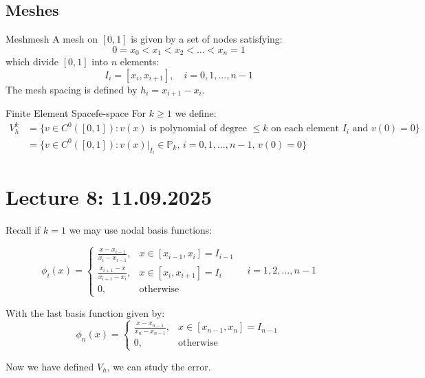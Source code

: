\subsection{Meshes}
\begin{definition}{Mesh}{mesh}
    A mesh on $[0, 1]$ is given by a set of nodes satisfying:
    \[0 = x_0 < x_1 < x_2 < \ldots < x_n= 1\]
    which divide $[0, 1]$ into $n$ elements:
    \[I_i = [x_i, x_{i+1}], \quad i = 0, 1, \ldots, n-1\]
    The mesh spacing is defined by $h_i = x_{i+1} - x_i$.
\end{definition}

\begin{definition}{Finite Element Space}{fe-space}
    For $k \geq 1$ we define:
    \begin{align*}
        V_h^k & = \{v \in C^0([0, 1]) : v(x) \text{ is polynomial of degree }\leq k \text{ on each element } I_i \text{ and } v(0) = 0\} \\
              & = \{v \in C^0([0, 1]) : v(x)\vert_{I_i} \in \mathbb{P}_k, \, i = 0, 1, \ldots, n-1, \, v(0) = 0\}
    \end{align*}
\end{definition}

\section{Lecture 8: 11.09.2025}

Recall if $k=1$ we may use nodal basis functions:

\[
    \phi_i(x)
    = \begin{cases}
        \frac{x - x_{i-1}}{x_i - x_{i-1}}, & x \in [x_{i-1}, x_i] =  I_{i-1} \\
        \frac{x_{i+1} - x}{x_{i+1} - x_i}, & x \in [x_i, x_{i+1}] = I_i      \\
        0,                                 & \text{otherwise}
    \end{cases}
    \quad i = 1, 2, \ldots, n-1
\]

With the last basis function given by:
\[
    \phi_n(x)
    = \begin{cases}
        \frac{x - x_{n-1}}{x_n - x_{n-1}}, & x \in [x_{n-1}, x_n] =  I_{n-1} \\
        0,                                 & \text{otherwise}
    \end{cases}
\]

Now we have defined $V_h$, we can study the error.

